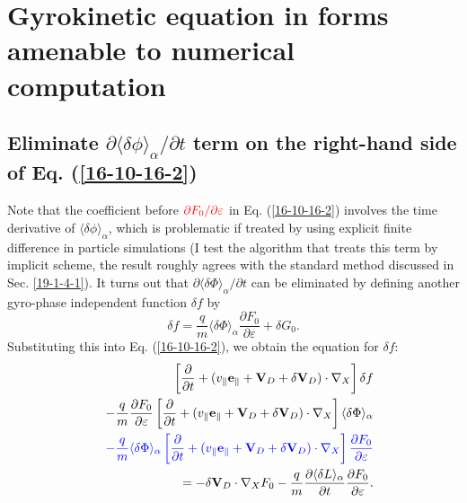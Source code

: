 \documentclass{article}
\newcommand{\tmcolor}[2]{{\color{#1}{#2}}}
\begin{document}
\section{Gyrokinetic equation in forms amenable to numerical computation}

\subsection{Eliminate $\partial \langle \delta \phi \rangle_{\alpha} /
\partial t$ term on the right-hand side of Eq. (\ref{16-10-16-2})}

Note that the coefficient before $\tmcolor{red}{\partial F_0 / \partial
\varepsilon}$ in Eq. (\ref{16-10-16-2}) involves the time derivative of
$\langle \delta \phi \rangle_{\alpha}$, which is problematic if treated by
using explicit finite difference in particle simulations (I test the algorithm
that treats this term by implicit scheme, the result roughly agrees with the
standard method discussed in Sec. \ref{19-1-4-1}). It turns out that $\partial
\langle \delta \Phi \rangle_{\alpha} / \partial t$ can be eliminated by
defining another gyro-phase independent function $\delta f$ by
\begin{equation}
  \label{16-10-16-1} \delta f = \frac{q}{m} \langle \delta \Phi
  \rangle_{\alpha} \frac{\partial F_0}{\partial \varepsilon} + \delta G_0 .
\end{equation}
Substituting this into Eq. (\ref{16-10-16-2}), we obtain the equation for
$\delta f$:
\begin{eqnarray}
  &  & \left[ \frac{\partial}{\partial t} + (v_{\parallel}
  \mathbf{e}_{\parallel} +\mathbf{V}_D + \delta \mathbf{V}_D) \cdot \nabla_X
  \right] \delta f \nonumber\\
  &  & - \frac{q}{m}  \frac{\partial F_0}{\partial \varepsilon} \left[
  \frac{\partial}{\partial t} + (v_{\parallel} \mathbf{e}_{\parallel}
  +\mathbf{V}_D + \delta \mathbf{V}_D) \cdot \nabla_X \right] \langle \delta
  \Phi \rangle_{\alpha} \nonumber\\
  &  & \tmcolor{blue}{- \frac{q}{m}  \langle \delta \Phi \rangle_{\alpha}
  \left[ \frac{\partial}{\partial t} + (v_{\parallel} \mathbf{e}_{\parallel}
  +\mathbf{V}_D + \delta \mathbf{V}_D) \cdot \nabla_X \right] \frac{\partial
  F_0}{\partial \varepsilon}} \nonumber\\
  &  & = - \delta \mathbf{V}_D \cdot \nabla_X F_0 - \frac{q}{m} 
  \frac{\partial \langle \delta L \rangle_{\alpha}}{\partial t} 
  \frac{\partial F_0}{\partial \varepsilon} . 
\end{eqnarray}
\end{document}
